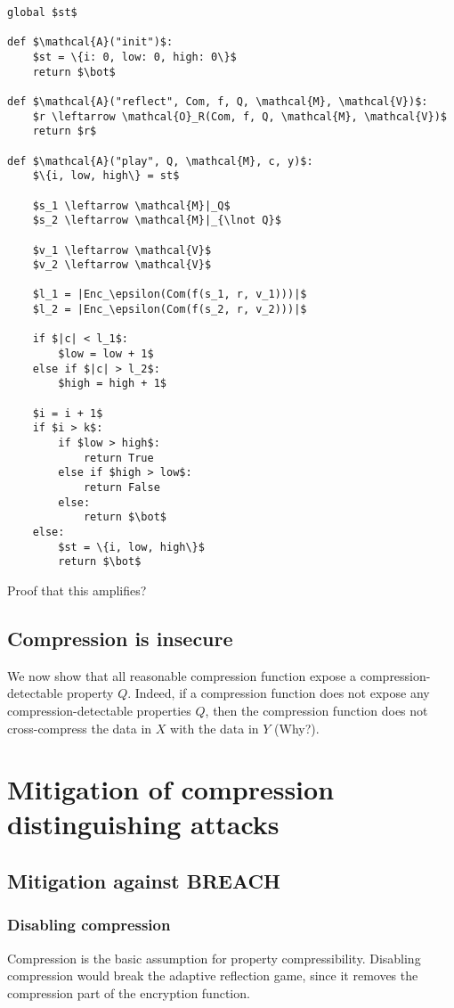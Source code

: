 \documentclass{article}
\begin{document}
\begin{lstlisting}[texcl,mathescape]
global $st$

def $\mathcal{A}("init")$:
    $st = \{i: 0, low: 0, high: 0\}$
    return $\bot$

def $\mathcal{A}("reflect", Com, f, Q, \mathcal{M}, \mathcal{V})$:
    $r \leftarrow \mathcal{O}_R(Com, f, Q, \mathcal{M}, \mathcal{V})$
    return $r$

def $\mathcal{A}("play", Q, \mathcal{M}, c, y)$:
    $\{i, low, high\} = st$

    $s_1 \leftarrow \mathcal{M}|_Q$
    $s_2 \leftarrow \mathcal{M}|_{\lnot Q}$

    $v_1 \leftarrow \mathcal{V}$
    $v_2 \leftarrow \mathcal{V}$

    $l_1 = |Enc_\epsilon(Com(f(s_1, r, v_1)))|$
    $l_2 = |Enc_\epsilon(Com(f(s_2, r, v_2)))|$

    if $|c| < l_1$:
        $low = low + 1$
    else if $|c| > l_2$:
        $high = high + 1$

    $i = i + 1$
    if $i > k$:
        if $low > high$:
            return True
        else if $high > low$:
            return False
        else:
            return $\bot$
    else:
        $st = \{i, low, high\}$
        return $\bot$
\end{lstlisting}

Proof that this amplifies?

\subsection{Compression is insecure}

We now show that all reasonable compression function expose a compression-detectable property $Q$. Indeed, if a compression function does not expose any compression-detectable properties $Q$, then the compression function does not cross-compress the data in $X$ with the data in $Y$ (Why?).

\section{Mitigation of compression distinguishing attacks}

\subsection{Mitigation against BREACH}

\subsubsection{Disabling compression}
Compression is the basic assumption for property compressibility. Disabling
compression would break the adaptive reflection game, since it removes
the compression part of the encryption function.
\end{document}
